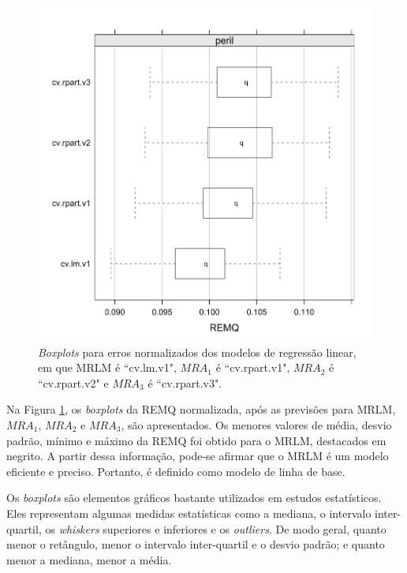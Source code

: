 \begin{figure}[h]
  \vspace{-0.2cm}
  \centering
  \includegraphics[width=\columnwidth]{image/mrl_ex1.pdf}
  \caption{\textit{Boxplots} para erros normalizados dos modelos de regressão linear, em que MRLM é ``cv.lm.v1", $MRA_1$ é ``cv.rpart.v1", $MRA_2$ é ``cv.rpart.v2" e $MRA_3$ é ``cv.rpart.v3".}
  \label{fig:mlrm_result}
\end{figure}

Na Figura \ref{fig:mlrm_result}, os \textit{boxplots} da REMQ normalizada, após as previsões para MRLM, $MRA_1$, $MRA_2$ e $MRA_3$, são apresentados. Os menores valores de média, desvio padrão, mínimo e máximo da REMQ foi obtido para o MRLM, destacados em negrito. A partir dessa informação, pode-se afirmar que o MRLM é um modelo eficiente e preciso. Portanto, é definido como modelo de linha de base.

Os \textit{boxplots} são elementos gráficos bastante utilizados em estudos estatísticos. Eles representam algumas medidas estatísticas como a mediana, o intervalo inter-quartil, os \textit{whiskers} superiores e inferiores e os \textit{outliers}. De modo geral, quanto menor o retângulo, menor o intervalo inter-quartil e o desvio padrão; e quanto menor a mediana, menor a média.


